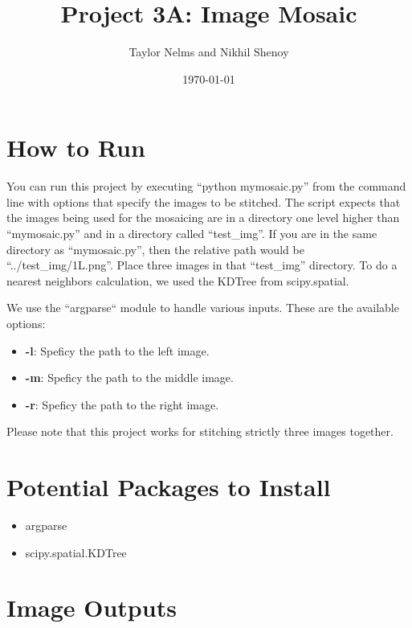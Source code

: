 \documentclass[10pt]{article}
\begin{document}
\title{\vspace{-2.0cm}Project 3A: Image Mosaic}
\author{Taylor Nelms and Nikhil Shenoy}
\date{\today}

\maketitle

\section{How to Run}
	You can run this project by executing ``python mymosaic.py'' from the command line with options that specify the images to be stitched. The script expects that the images being used for the mosaicing are in a directory one level higher than ``mymosaic.py'' and in a directory called ``test\_img''. If you are in the same directory as ``mymosaic.py'', then the relative path would be ``../test\_img/1L.png''. Place three images in that ``test\_img'' directory. To do a nearest neighbors calculation, we used the KDTree from scipy.spatial.

	We use the ``argparse`` module to handle various inputs. These are the available options:

	\begin{itemize}
		\item \textbf{-l}: Speficy the path to the left image.
		\item \textbf{-m}: Speficy the path to the middle image.
		\item \textbf{-r}: Speficy the path to the right image.
	\end{itemize}

	Please note that this project works for stitching strictly three images together.

\section{Potential Packages to Install}

	\begin{itemize}
		\item argparse
		\item scipy.spatial.KDTree
	\end{itemize}

\section{Image Outputs}
\end{document}

